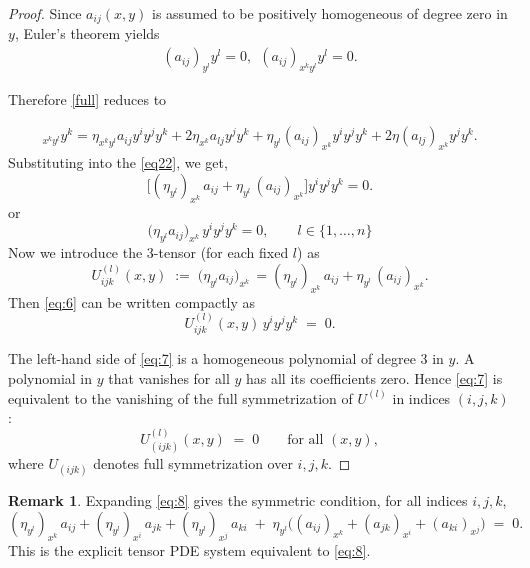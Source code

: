\documentclass[12pt]{article}
\theoremstyle{definition}
\newtheorem{remark}[theorem]{Remark}
\begin{document}
\begin{proof}
						Since $a_{ij}(x,y)$ is assumed to be positively homogeneous of degree
						zero in $y$, Euler's theorem yields
						\begin{align}
							(a_{ij})_{y^l}y^l=0, ~~ (a_{ij})_{x^ky^l}y^l=0.
							\label{Euler}
						\end{align}
						
						Therefore \eqref{full} reduces to
						
						\begin{align}
							[F^2]_{x^ky^l}y^k
							=
							\eta_{x^ky^l}a_{ij}y^iy^jy^k
							+
							2\eta_{x^k}a_{lj}y^jy^k
							+
							\eta_{y^l}(a_{ij})_{x^k}y^iy^jy^k
							+
							2\eta(a_{lj})_{x^k}y^jy^k.
						\end{align}
						Substituting into the \eqref{eq22}, we get,
						\[
						\big[(\eta_{y^l})_{x^k}\,a_{ij} + \eta_{y^l}\,(a_{ij})_{x^k}\big] y^i y^j y^k = 0.
						\]                    or                          \begin{equation}\label{eq:6}
						\big(\eta_{y^l} a_{ij}\big)_{x^k}\,y^i y^j y^k = 0,
						\qquad l\in\{1,\dots,n\}
						\end{equation}
						Now we 
						introduce the \(3\)-tensor (for each fixed \(l\)) as 
						\begin{equation}\label{eq:1}
						U^{(l)}_{ijk}(x,y) \;:=\; \big(\eta_{y^l} a_{ij}\big)_{x^k}\,=(\eta_{y^l})_{x^k}\,a_{ij} + \eta_{y^l}\,(a_{ij})_{x^k}.
						\end{equation}
						Then \eqref{eq:6} can be written  compactly as
						\begin{equation}\label{eq:7}
						U^{(l)}_{ijk}(x,y)\,y^i y^j y^k \;=\; 0.
						\end{equation}
						
						
						The left-hand side of \eqref{eq:7} is a homogeneous polynomial of degree \(3\)
						in \(y\). A polynomial in \(y\) that vanishes for all \(y\) has all its
						coefficients zero. Hence \eqref{eq:7} is equivalent to the vanishing of the full
						symmetrization of \(U^{(l)}\) in indices \((i,j,k)\):
						\begin{equation}\label{eq:8}
						U^{(l)}_{(ijk)}(x,y)\;=\;0\qquad\text{for all }(x,y),
						\end{equation}
						where \(U_{(ijk)}\) denotes full symmetrization over \(i,j,k\).
					\end{proof} 
					\begin{remark}
						\textnormal{Expanding \eqref{eq:8} gives the symmetric condition, for all indices \(i,j,k\),
							\[
							(\eta_{y^l})_{x^k}\,a_{ij} + (\eta_{y^l})_{x^i}\,a_{jk} + (\eta_{y^l})_{x^j}\,a_{ki}
							\;+\; \eta_{y^l}\big( (a_{ij})_{x^k} + (a_{jk})_{x^i} + (a_{ki})_{x^j}\big)
							\;=\;0.
							\]  
							This is the explicit tensor PDE system equivalent to \eqref{eq:8}.}
						\end{remark}
						
\end{document}
